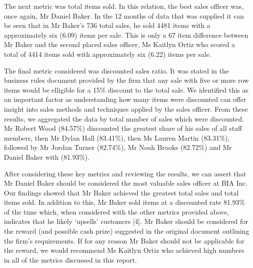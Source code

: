 \documentclass{article}
\begin{document}
    \noindent The next metric was total items sold. In this relation, the best sales officer was,
    once again, Mr Daniel Baker. In the 12 months of data that was 
    supplied it can be seen that in Mr Baker’s 736 total sales, he 
    sold 4481 items with a approximately six (6.09) items per sale. This is only a 67 item
    difference between Mr Baker and the second placed sales officer, Ms Kaitlyn Ortiz who
    scored a total of 4414 items sold with approximately six (6.22) items per sale. 
    \vspace{5mm}
    \par\noindent

    \noindent The final metric considered was discounted sales ratio. It was stated in the
    business rules document provided by the firm that any sale with five or more row items
    would be elligible for a 15\% discount to the total sale. We identified this as an
    important factor as understanding how many items were discounted can offer
    insight into sales methods and techniques applied by the sales officer. From these
    results, we aggregated the data by total number of sales which were discounted.
    Mr Robert Wood (84.57\%) discounted the greatest share of his sales of all staff
    members, then Mr Dylan Hall (83.41\%), then Ms Lauren Martin
    (83.31\%), followed by Mr Jordan Turner (82.74\%), Mr Noah Brooks (82.72\%) and Mr
    Daniel Baker with (81.93\%).
    \vspace{5mm}
    \par

    \noindent After considering these key metrics and reviewing the results, we can assert that 
    Mr Daniel Baker should be considered the most valuable sales officer at BIA Inc. Our findings showed
    that Mr Baker achieved the greatest total sales and total items sold.  In addition to this,
    Mr Baker sold items at a discounted rate 81.93\% of the time which, when considered with the
    other metrics provided above, indicates that he likely `upsells' customers [4]. 
    Mr Baker should be considered for the reward (and possible
    cash prize) suggested in the original document outlining the firm's requirements.
    If for any reason Mr Baker should not be applicable for the reward, we would recommend 
    Ms Kaitlyn Ortiz who achieved high numbers in all of the metrics discussed in this report. 
\end{document}
